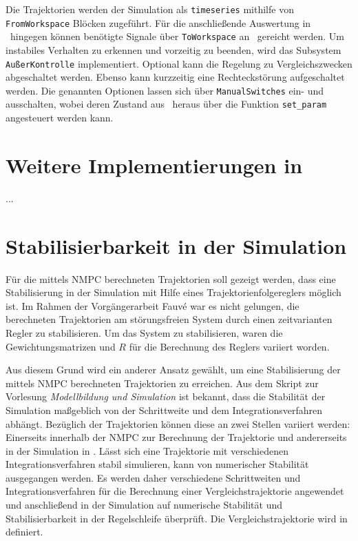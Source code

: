 Die Trajektorien werden der Simulation als \texttt{timeseries} mithilfe von \texttt{FromWorkspace} Blöcken zugeführt. Für die anschließende Auswertung in \Matlab\ hingegen können benötigte Signale über \texttt{ToWorkspace} an \Matlab\ gereicht werden. Um instabiles Verhalten zu erkennen und vorzeitig zu beenden, wird das Subsystem \texttt{AußerKontrolle} implementiert. Optional kann die Regelung zu Vergleichszwecken abgeschaltet werden. Ebenso kann kurzzeitig eine Rechteckstörung aufgeschaltet werden. Die genannten Optionen lassen sich über \texttt{ManualSwitches} ein- und ausschalten, wobei deren Zustand aus \Matlab\ heraus über die Funktion \texttt{set\_param} angesteuert werden kann.



\section{Weitere Implementierungen in \Matlab}
...



\section{Stabilisierbarkeit in der Simulation}\label{stabiltrj}

\newcommand{\scaleyplots}{0.6}

Für die mittels NMPC berechneten Trajektorien soll gezeigt werden, dass eine Stabilisierung in der Simulation mit Hilfe eines Trajektorienfolgereglers möglich ist. Im Rahmen der Vorgängerarbeit Fauvé \cite{fauve} war es nicht gelungen, die berechneten Trajektorien am störungsfreien System durch einen zeitvarianten Regler zu stabilisieren. Um das System zu stabilisieren, waren die Gewichtungsmatrizen  und $R$ für die Berechnung des Reglers variiert worden.

Aus diesem Grund wird ein anderer Ansatz gewählt, um eine Stabilisierung der mittels NMPC berechneten Trajektorien zu erreichen. Aus dem Skript \cite{modsim} zur Vorlesung \emph{Modellbildung und Simulation} ist bekannt, dass die Stabilität der Simulation maßgeblich von der Schrittweite und dem Integrationsverfahren abhängt. Bezüglich der Trajektorien können diese an zwei Stellen variiert werden: Einerseits innerhalb der NMPC zur Berechnung der Trajektorie und andererseits in der Simulation in \Simulink. Lässt sich eine Trajektorie mit verschiedenen Integrationsverfahren stabil simulieren, kann von numerischer Stabilität ausgegangen werden. Es werden daher verschiedene Schrittweiten und Integrationsverfahren für die Berechnung einer Vergleichstrajektorie angewendet und anschließend in der Simulation auf numerische Stabilität und Stabilisierbarkeit in der Regelschleife überprüft. Die Vergleichstrajektorie wird in  definiert.


